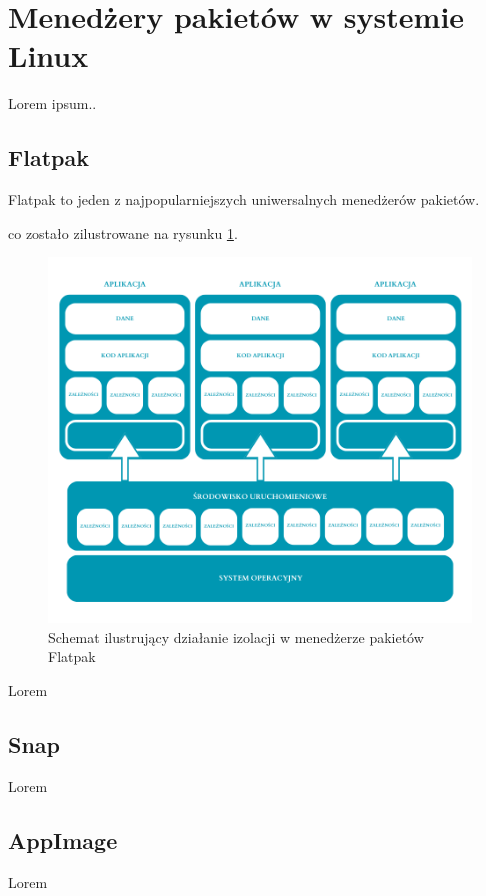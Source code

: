 \section{Menedżery pakietów w systemie Linux}

Lorem ipsum..

\subsection{Flatpak}



Flatpak \cite{flatpak-future} to jeden z najpopularniejszych uniwersalnych menedżerów pakietów.

 co zostało zilustrowane na rysunku \ref{fig:flatpak-schemat}.

\begin{figure}[htbp]
    \centering
    \includegraphics[width=\linewidth]{img/schematy/flatpak_schemat.png}
    \caption{Schemat ilustrujący działanie izolacji w menedżerze pakietów Flatpak}
    \label{fig:flatpak-schemat}
\end{figure}

Lorem

\subsection{Snap}

Lorem

\subsection{AppImage}

Lorem